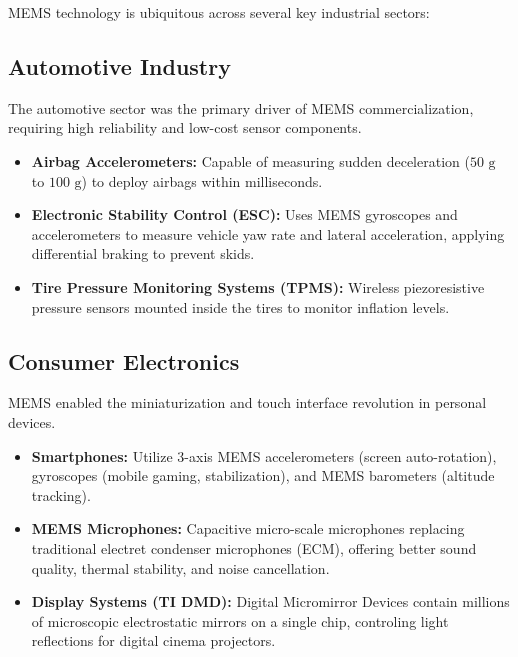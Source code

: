 \documentclass[12pt,a4paper]{article}
\begin{document}
MEMS technology is ubiquitous across several key industrial sectors:

\subsection{Automotive Industry}
The automotive sector was the primary driver of MEMS commercialization, requiring high reliability and low-cost sensor components.
\begin{itemize}[leftmargin=*, itemsep=3pt]
  \item \textbf{Airbag Accelerometers:} Capable of measuring sudden deceleration ($50\text{ g}$ to $100\text{ g}$) to deploy airbags within milliseconds.
  \item \textbf{Electronic Stability Control (ESC):} Uses MEMS gyroscopes and accelerometers to measure vehicle yaw rate and lateral acceleration, applying differential braking to prevent skids.
  \item \textbf{Tire Pressure Monitoring Systems (TPMS):} Wireless piezoresistive pressure sensors mounted inside the tires to monitor inflation levels.
\end{itemize}

\subsection{Consumer Electronics}
MEMS enabled the miniaturization and touch interface revolution in personal devices.
\begin{itemize}[leftmargin=*, itemsep=3pt]
  \item \textbf{Smartphones:} Utilize 3-axis MEMS accelerometers (screen auto-rotation), gyroscopes (mobile gaming, stabilization), and MEMS barometers (altitude tracking).
  \item \textbf{MEMS Microphones:} Capacitive micro-scale microphones replacing traditional electret condenser microphones (ECM), offering better sound quality, thermal stability, and noise cancellation.
  \item \textbf{Display Systems (TI DMD):} Digital Micromirror Devices contain millions of microscopic electrostatic mirrors on a single chip, controling light reflections for digital cinema projectors.
\end{itemize}
\end{document}
